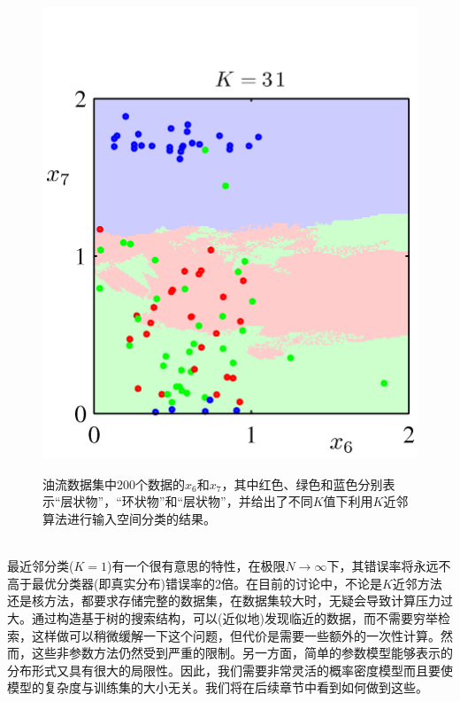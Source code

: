 \documentclass[b5paper]{book}
\numberwithin{equation}{chapter}
\begin{document}
{\begin{figure}[ht]
\begin{minipage}[t]{0.3\linewidth}
		\label{fig:2-28b}
		\end{minipage}
		\begin{minipage}[t]{0.3\linewidth}
		\centering
		\includegraphics[scale=0.8]{Images/2-28c.png}
		\label{fig:2-28c}
		\end{minipage}
		\caption{油流数据集中200个数据的$x_6$和$x_7$，其中红色、绿色和蓝色分别表示“层状物”，“环状物”和“层状物”，并给出了不同$K$值下利用$K$近邻算法进行输入空间分类的结果。}
	\end{figure}
	\\
	\indent 最近邻分类($K=1$)有一个很有意思的特性，在极限$N \rightarrow \infty$下，其错误率将永远不高于最优分类器(即真实分布)错误率的2倍。在目前的讨论中，不论是$K$近邻方法还是核方法，都要求存储完整的数据集，在数据集较大时，无疑会导致计算压力过大。通过构造基于树的搜索结构，可以(近似地)发现临近的数据，而不需要穷举检索，这样做可以稍微缓解一下这个问题，但代价是需要一些额外的一次性计算。然而，这些非参数方法仍然受到严重的限制。另一方面，简单的参数模型能够表示的分布形式又具有很大的局限性。因此，我们需要非常灵活的概率密度模型而且要使模型的复杂度与训练集的大小无关。我们将在后续章节中看到如何做到这些。
	}
\end{document}

